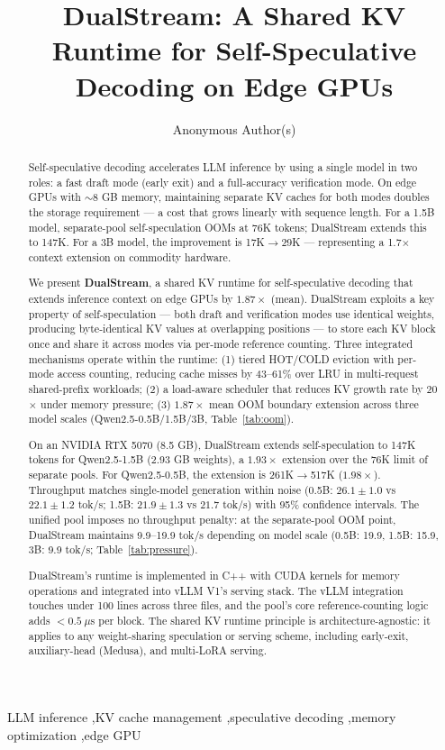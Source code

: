 \documentclass[review]{elsarticle}
\title{DualStream: A Shared KV Runtime for Self-Speculative Decoding on Edge GPUs}
\author[1]{Anonymous Author(s)}
\theoremstyle{definition}
\theoremstyle{remark}
\begin{document}
\begin{frontmatter}
\begin{abstract}
Self-speculative decoding accelerates LLM inference by using a single model
in two roles: a fast draft mode (early exit) and a full-accuracy verification
mode. On edge GPUs with $\sim$8 GB memory, maintaining separate KV caches for
both modes doubles the storage requirement --- a cost that grows linearly with
sequence length. For a 1.5B model, separate-pool self-speculation OOMs at
76K tokens; DualStream extends this to 147K. For a 3B model, the improvement
is 17K$\to$29K --- representing a 1.7$\times$ context extension on commodity hardware.

We present \textbf{DualStream}, a shared KV runtime for self-speculative
decoding that extends inference context on edge GPUs by $1.87\times$ (mean).
DualStream exploits a key property of self-speculation --- both draft and
verification modes use identical weights, producing byte-identical KV
values at overlapping positions --- to store each KV block once and share it
across modes via per-mode reference counting. Three integrated mechanisms
operate within the runtime: (1) tiered HOT/COLD eviction with per-mode
access counting, reducing cache misses by 43--61\% over LRU in multi-request
shared-prefix workloads; (2) a load-aware scheduler that reduces KV growth
rate by 20$\times$ under memory pressure; (3) $1.87\times$ mean OOM boundary
extension across three model scales (Qwen2.5-0.5B/1.5B/3B, Table~\ref{tab:oom}).

On an NVIDIA RTX 5070 (8.5 GB), DualStream extends self-speculation
to 147K tokens for Qwen2.5-1.5B (2.93 GB weights), a $1.93\times$ extension
over the 76K limit of separate pools. For Qwen2.5-0.5B, the extension is 261K$\to$517K
($1.98\times$). Throughput matches single-model generation within noise
(0.5B: $26.1 \pm 1.0$ vs $22.1 \pm 1.2$ tok/s; 1.5B: $21.9 \pm 1.3$
vs $21.7$ tok/s) with 95\% confidence intervals. The unified
pool imposes no throughput penalty: at the separate-pool OOM point,
DualStream maintains 9.9--19.9 tok/s depending on model scale (0.5B: 19.9, 1.5B: 15.9, 3B: 9.9 tok/s; Table~\ref{tab:pressure}).

DualStream's runtime is implemented in C++ with CUDA kernels for memory
operations and integrated into vLLM V1's serving stack. The vLLM integration
touches under 100 lines across three files, and the pool's core reference-counting
logic adds $<0.5~\mu$s per block. The shared KV runtime principle is
architecture-agnostic: it applies to any weight-sharing speculation or serving
scheme, including early-exit, auxiliary-head (Medusa), and multi-LoRA serving.
\end{abstract}

\begin{keyword}
LLM inference \sep KV cache management \sep speculative decoding \sep memory optimization \sep edge GPU
\end{keyword}

\end{frontmatter}
\end{document}
